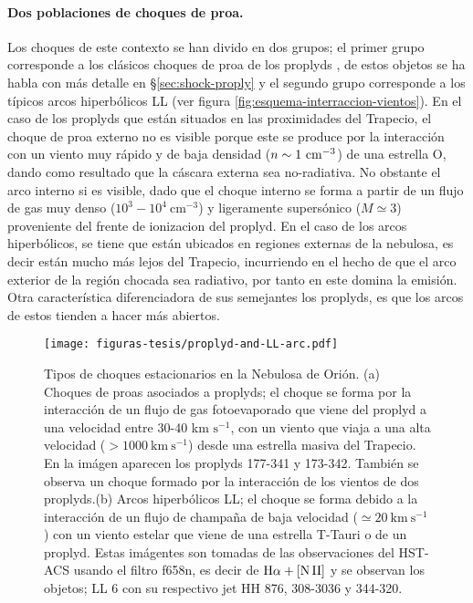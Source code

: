 \paragraph{Dos poblaciones de choques de proa.}
Los choques de este contexto se han divido en dos grupos; el primer grupo corresponde a los clásicos choques de proa de los proplyds \citep{Robberto:2005, Bally:1998a}, de estos objetos se ha habla con más detalle en \S\ref{sec:shock-proply} y el segundo grupo corresponde a los típicos arcos hiperbólicos LL (ver figura \ref{fig:esquema-interraccion-vientos}). En el caso de los proplyds que están situados en las proximidades del Trapecio, el choque de proa externo no es visible porque este se produce por la interacción con un viento muy rápido y de baja densidad (\(n \sim 1 ~\mathrm{cm}^{-3}\)) de una estrella O, dando como resultado que la cáscara externa sea no-radiativa. No obstante el arco interno si es visible, dado que el choque interno se forma a partir de un flujo de gas muy denso (\(10^{3}-10^{4}~\text{cm}^{-3}\)) y ligeramente supersónico (\(M \simeq 3\)) proveniente del frente de ionizacion del proplyd. En el caso de los arcos hiperbólicos, se tiene que están ubicados en regiones externas de la nebulosa, es decir están mucho más lejos del Trapecio, incurriendo en el hecho de que el arco exterior de la región chocada sea radiativo, por tanto en este domina la emisión. Otra característica diferenciadora de sus semejantes los proplyds, es que los arcos de estos tienden a hacer más abiertos.\\ 

\begin{figure}
  \centering
  \texttt{[image: figuras-tesis/proplyd-and-LL-arc.pdf]}
  \caption{Tipos de choques estacionarios en la Nebulosa de Orión. (a) Choques de proas asociados a proplyds; el choque se forma por la interacción de un flujo de gas fotoevaporado que viene del proplyd a una velocidad entre 30-40 km \(\text{s}^{-1}\), con un viento que viaja a una alta velocidad (\(>1000 ~\text{km} ~\text{s}^{-1}\)) desde una estrella masiva del Trapecio. En la imágen aparecen los proplyds 177-341 y 173-342. También se observa un choque formado por la interacción de los vientos de dos proplyds.(b) Arcos hiperbólicos LL; el choque se forma debido a la interacción de un flujo de champaña de baja velocidad (\(\simeq 20~\text{km} ~\text{s}^{-1}\)) con un viento estelar que viene de una estrella T-Tauri o de un proplyd. Estas imágentes son tomadas de las observaciones del HST-ACS usando el filtro f658n, es decir de \(\mathrm{H}\alpha + \mathrm{[N\,II]}\) y se observan los objetos; LL 6 con su respectivo jet HH 876, 308-3036 y 344-320. }
  \label{fig:proplydbow-objetoll}
\end{figure}

